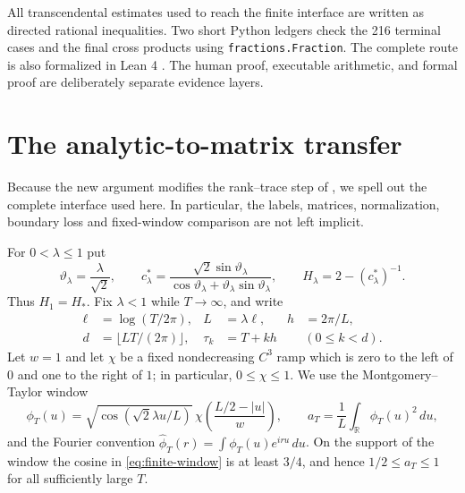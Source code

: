 \documentclass[11pt,reqno]{amsart}
\theoremstyle{definition}
\theoremstyle{remark}
\begin{document}
All transcendental estimates used to reach the finite interface are written
as directed rational inequalities.  Two short Python ledgers check the 216
terminal cases and the final cross products using \texttt{fractions.Fraction}.
The complete route is also formalized in Lean 4
\cite{deMouraEtAl2021,Mathlib2020}.  The human proof, executable arithmetic,
and formal proof are deliberately separate evidence layers.

\section{The analytic-to-matrix transfer}

Because the new argument modifies the rank--trace step of
\cite[Sections~2--7]{Claude2026}, we spell out the complete interface used
here.  In particular, the labels, matrices, normalization, boundary loss and
fixed-window comparison are not left implicit.

For $0<\lambda\le1$ put
\begin{equation}\label{eq:fixed-lambda-constant}
 \vartheta_\lambda=\frac{\lambda}{\sqrt2},\qquad
 c_\lambda^*=\frac{\sqrt2\sin\vartheta_\lambda}
 {\cos\vartheta_\lambda+\vartheta_\lambda\sin\vartheta_\lambda},
 \qquad H_\lambda=2-(c_\lambda^*)^{-1}.
\end{equation}
Thus $H_1=H_*$.  Fix $\lambda<1$ while $T\to\infty$, and write
\begin{align*}
 \ell&=\log(T/2\pi), & L&=\lambda\ell, & h&=2\pi/L,\\
 d&=\lfloor LT/(2\pi)\rfloor,
 & \tau_k&=T+kh &&(0\le k<d).
\end{align*}
Let $w=1$ and let $\chi$ be a fixed nondecreasing $C^3$ ramp which is zero to
the left of $0$ and one to the right of $1$; in particular,
$0\le\chi\le1$.  We use the Montgomery--Taylor window
\begin{equation}\label{eq:finite-window}
 \phi_T(u)=
 \sqrt{\cos(\sqrt2\lambda u/L)}\,
 \chi\left(\frac{L/2-|u|}{w}\right),
 \qquad
 a_T=\frac1L\int_{\mathbb R}\phi_T(u)^2\,du,
\end{equation}
and the Fourier convention
$\widehat\phi_T(r)=\int\phi_T(u)e^{iru}\,du$.  On the support of the
window the cosine in \eqref{eq:finite-window} is at least $3/4$, and hence
$1/2\le a_T\le1$ for all sufficiently large $T$.
\end{document}
